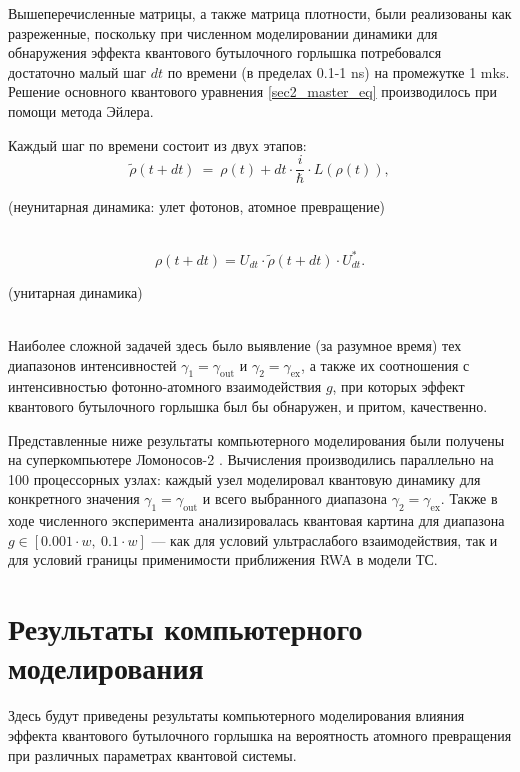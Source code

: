 \noindent Вышеперечисленные матрицы, а также матрица плотности, были реализованы как разреженные, поскольку при численном моделировании динамики для обнаружения эффекта квантового бутылочного горлышка потребовался достаточно малый шаг $dt$ по времени (в пределах 0.1-1 ns) на промежутке 1 mks. Решение основного квантового уравнения \eqref{sec2_master_eq} производилось при помощи метода Эйлера. 

\noindent Каждый шаг по времени состоит из двух этапов:
\[
\tilde{\rho}(t+dt)\ =\ \rho(t)+dt\cdot \frac{i}{\hbar}\cdot L(\rho(t)),
\]
\begin{center}\text(неунитарная динамика: улет фотонов, атомное превращение)\end{center}
\
\\[0pt]
\[
\rho(t+dt)=U_{dt}\cdot \tilde{\rho}(t+dt)\cdot U_{dt}^{*}.
\]
\begin{center}\text(унитарная динамика)\end{center}
\
\\
\indent Наиболее сложной задачей здесь было выявление (за разумное время) тех диапазонов интенсивностей $\gamma_{1} = \gamma_{\text{out}}$ и
$\gamma_{2} = \gamma_{\text{ex}}$, а также их соотношения с интенсивностью фотонно-атомного взаимодействия $g$, при которых эффект квантового бутылочного горлышка был бы обнаружен, и притом, качественно.

Представленные ниже результаты компьютерного моделирования были получены на суперкомпьютере Ломоносов-2 \cite{voevodin_supercomputer}. Вычисления производились параллельно на 100 процессорных узлах: каждый узел моделировал квантовую динамику для конкретного значения $\gamma_{1} = \gamma_{\text{out}}$ и всего выбранного диапазона $\gamma_{2} = \gamma_{\text{ex}}$. Также в ходе численного эксперимента анализировалась квантовая картина для диапазона $g \in [0.001 \cdot w,~0.1 \cdot w]$ --- как для условий ультраслабого взаимодействия, так и для условий границы применимости приближения RWA \cite{ozhigov_qq, rwa_1, rwa_2} в модели ТС. 

\section{Результаты компьютерного моделирования}\label{sec:ch2/sec3}
Здесь будут приведены результаты компьютерного моделирования влияния эффекта квантового бутылочного горлышка на вероятность атомного превращения при различных параметрах квантовой системы.

